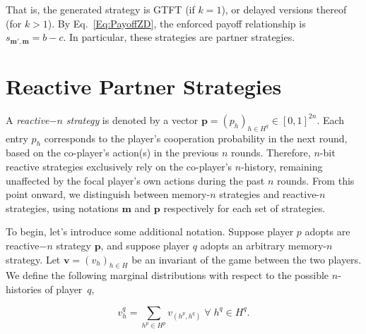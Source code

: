 \documentclass{article}
\theoremstyle{definition}
\begin{document}
That is, the generated strategy is GTFT (if $k\!=\!1$), or delayed versions
thereof (for $k\!>\!1$). By Eq.~\eqref{Eq:PayoffZD}, the enforced payoff
relationship is $s_{\mathbf{m'}, \mathbf{m}}\!=\!b\!-\!c$. In particular, these
strategies are partner strategies.\\




\section{Reactive Partner Strategies}\label{section:reactive_strategies}

A {\it reactive$-n$ strategy} is denoted by a vector
$\mathbf{p}=(p_h)_{h\in H^q}\in[0,1]^{2n}$. Each entry $p_h$ corresponds to the
player's cooperation probability in the next round, based on the co-player's
action(s) in the previous $n$ rounds. Therefore, $n$-bit reactive strategies
exclusively rely on the co-player's $n$-history, remaining unaffected by the
focal player's own actions during the past $n$ rounds. From this point onward,
we distinguish between memory-$n$ strategies and reactive-$n$ strategies, using
notations $\mathbf{m}$ and $\mathbf{p}$ respectively for each set of strategies.

To begin, let's introduce some additional notation. Suppose player $p$ adopts
are reactive$-n$ strategy $\mathbf{p}$, and suppose player $q$ adopts an
arbitrary memory-$n$ strategy. Let $\mathbf{v}=(v_h)_{h\in H}$ be an invariant
of the game between the two players. We define the following marginal
distributions with respect to the possible $n$-histories of player~$q$,

\begin{equation}\label{Eq:marginal_distributions}
\displaystyle v^q_{h} = \sum_{h^p\in H^p} v_{(h^p,h^q)} \; \forall \; h^q \in H^q.
\end{equation}
\end{document}
